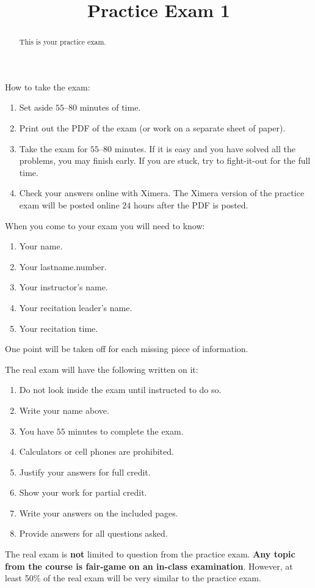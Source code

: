 \documentclass{ximera}
\title{Practice Exam 1}
\begin{document}
\begin{abstract}
This is your practice exam.
\end{abstract}
\maketitle
\thispagestyle{empty}


How to take the exam:
\begin{enumerate}
  \item Set aside $55$--$80$ minutes of time.
  \item Print out the PDF of the exam (or work on a separate sheet of paper).
  \item Take the exam for $55$--$80$ minutes. If it is easy and you have
    solved all the problems, you may finish early. If you are stuck,
    try to fight-it-out for the full time.
  \item Check your answers online with Ximera. The Ximera version of
    the practice exam will be posted online $24$ hours after the PDF is
    posted.
\end{enumerate}


When you come to your exam you will need to know:
\begin{enumerate}
\item Your name.
\item Your lastname.number.
\item Your instructor's name.
\item Your recitation leader's name.
\item Your recitation time.
\end{enumerate}
One point will be taken off for each missing piece of information.

The real exam will have the following written on it:

\begin{enumerate}
\item Do not look inside the exam until instructed to do so.
\item Write your name above.
\item You have $55$ minutes to complete the exam.
\item Calculators or cell phones are prohibited.
\item Justify your answers for full credit.
\item Show your work for partial credit.
\item Write your answers on the included pages.
\item Provide answers for all questions asked.
\end{enumerate}

The real exam is \textbf{not} limited to question from the practice
exam. \textbf{Any topic from the course is fair-game on an in-class
  examination}.  However, at least 50\% of the real exam will be very
similar to the practice exam.
\end{document}
